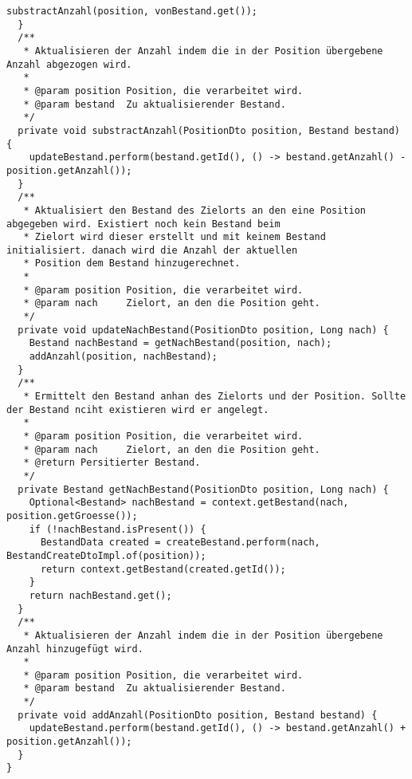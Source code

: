 \begin{lstlisting}[caption={Speicherung einer neuen Transaktion.}, label={lst:TransaktionExecution}]
    substractAnzahl(position, vonBestand.get());
  }
  /**
   * Aktualisieren der Anzahl indem die in der Position übergebene Anzahl abgezogen wird.
   *
   * @param position Position, die verarbeitet wird.
   * @param bestand  Zu aktualisierender Bestand.
   */
  private void substractAnzahl(PositionDto position, Bestand bestand) {
    updateBestand.perform(bestand.getId(), () -> bestand.getAnzahl() - position.getAnzahl());
  }
  /**
   * Aktualisiert den Bestand des Zielorts an den eine Position abgegeben wird. Existiert noch kein Bestand beim
   * Zielort wird dieser erstellt und mit keinem Bestand initialisiert. danach wird die Anzahl der aktuellen
   * Position dem Bestand hinzugerechnet.
   *
   * @param position Position, die verarbeitet wird.
   * @param nach     Zielort, an den die Position geht.
   */
  private void updateNachBestand(PositionDto position, Long nach) {
    Bestand nachBestand = getNachBestand(position, nach);
    addAnzahl(position, nachBestand);
  }
  /**
   * Ermittelt den Bestand anhan des Zielorts und der Position. Sollte der Bestand nciht existieren wird er angelegt.
   *
   * @param position Position, die verarbeitet wird.
   * @param nach     Zielort, an den die Position geht.
   * @return Persitierter Bestand.
   */
  private Bestand getNachBestand(PositionDto position, Long nach) {
    Optional<Bestand> nachBestand = context.getBestand(nach, position.getGroesse());
    if (!nachBestand.isPresent()) {
      BestandData created = createBestand.perform(nach, BestandCreateDtoImpl.of(position));
      return context.getBestand(created.getId());
    }
    return nachBestand.get();
  }
  /**
   * Aktualisieren der Anzahl indem die in der Position übergebene Anzahl hinzugefügt wird.
   *
   * @param position Position, die verarbeitet wird.
   * @param bestand  Zu aktualisierender Bestand.
   */
  private void addAnzahl(PositionDto position, Bestand bestand) {
    updateBestand.perform(bestand.getId(), () -> bestand.getAnzahl() + position.getAnzahl());
  }
}
\end{lstlisting}

